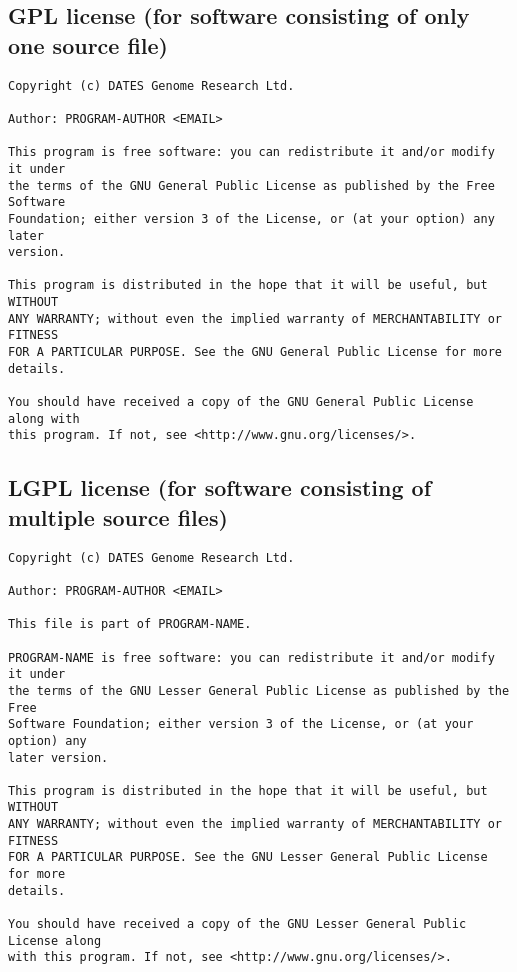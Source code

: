 \documentclass[10pt,a4paper]{article}
\begin{document}
\subsection{GPL license (for software consisting of only one source file)}
\begin{boilerplate}
\begin{verbatim}
Copyright (c) DATES Genome Research Ltd. 

Author: PROGRAM-AUTHOR <EMAIL> 

This program is free software: you can redistribute it and/or modify it under 
the terms of the GNU General Public License as published by the Free Software 
Foundation; either version 3 of the License, or (at your option) any later 
version. 

This program is distributed in the hope that it will be useful, but WITHOUT 
ANY WARRANTY; without even the implied warranty of MERCHANTABILITY or FITNESS 
FOR A PARTICULAR PURPOSE. See the GNU General Public License for more 
details. 

You should have received a copy of the GNU General Public License along with 
this program. If not, see <http://www.gnu.org/licenses/>. 
\end{verbatim}
\end{boilerplate}

\subsection{LGPL license (for software consisting of multiple source files)}
\begin{boilerplate}
\begin{verbatim}
Copyright (c) DATES Genome Research Ltd. 

Author: PROGRAM-AUTHOR <EMAIL> 

This file is part of PROGRAM-NAME. 

PROGRAM-NAME is free software: you can redistribute it and/or modify it under 
the terms of the GNU Lesser General Public License as published by the Free 
Software Foundation; either version 3 of the License, or (at your option) any 
later version. 
 
This program is distributed in the hope that it will be useful, but WITHOUT 
ANY WARRANTY; without even the implied warranty of MERCHANTABILITY or FITNESS 
FOR A PARTICULAR PURPOSE. See the GNU Lesser General Public License for more 
details. 
 
You should have received a copy of the GNU Lesser General Public License along 
with this program. If not, see <http://www.gnu.org/licenses/>. 
\end{verbatim}
\end{boilerplate}
\end{document}
